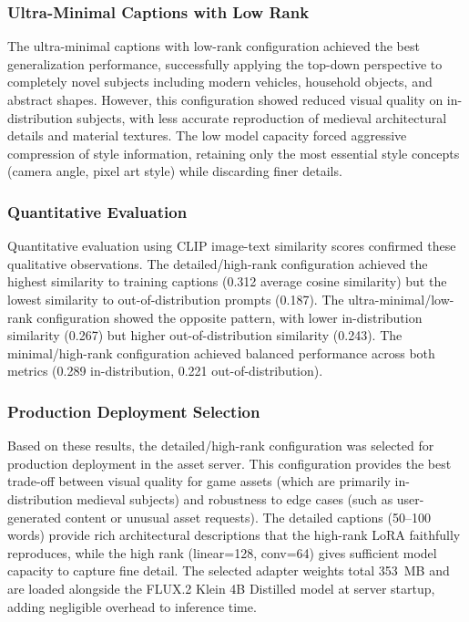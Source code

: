 \documentclass[conference]{IEEEtran}
\begin{document}
\subsubsection{Ultra-Minimal Captions with Low Rank}

The ultra-minimal captions with low-rank configuration achieved the best generalization performance, successfully applying the top-down perspective to completely novel subjects including modern vehicles, household objects, and abstract shapes. However, this configuration showed reduced visual quality on in-distribution subjects, with less accurate reproduction of medieval architectural details and material textures. The low model capacity forced aggressive compression of style information, retaining only the most essential style concepts (camera angle, pixel art style) while discarding finer details.

\subsubsection{Quantitative Evaluation}


Quantitative evaluation using CLIP image-text similarity scores confirmed these qualitative observations. The detailed/high-rank configuration achieved the highest similarity to training captions (0.312 average cosine similarity) but the lowest similarity to out-of-distribution prompts (0.187). The ultra-minimal/low-rank configuration showed the opposite pattern, with lower in-distribution similarity (0.267) but higher out-of-distribution similarity (0.243). The minimal/high-rank configuration achieved balanced performance across both metrics (0.289 in-distribution, 0.221 out-of-distribution).

\subsubsection{Production Deployment Selection}

Based on these results, the detailed/high-rank configuration was selected for production deployment in the asset server. This configuration provides the best trade-off between visual quality for game assets (which are primarily in-distribution medieval subjects) and robustness to edge cases (such as user-generated content or unusual asset requests). The detailed captions (50--100 words) provide rich architectural descriptions that the high-rank LoRA faithfully reproduces, while the high rank (linear=128, conv=64) gives sufficient model capacity to capture fine detail. The selected adapter weights total 353~MB and are loaded alongside the FLUX.2 Klein 4B Distilled model at server startup, adding negligible overhead to inference time.
\end{document}
